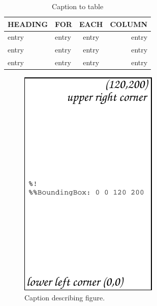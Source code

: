 \documentclass[preprint]{iucr}              %
\begin{document}




\begin{table}
\caption{Caption to table}
\begin{tabular}{llcr}      %
 HEADING    & FOR        & EACH       & COLUMN     \\
\hline
 entry      & entry      & entry      & entry      \\
 entry      & entry      & entry      & entry      \\
 entry      & entry      & entry      & entry      \\
\end{tabular}
\end{table}


\begin{figure}
\caption{Caption describing figure.}
\includegraphics{fig1}
\end{figure}
\end{document}
